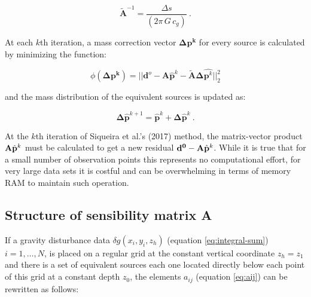 \documentclass[paper]{geophysics}
\begin{document}
\begin{equation}
\tilde{\mathbf{A}}^{-1} = \frac{\Delta s}{(2 \pi \, G \, c_g)} \: .
\label{eq:a_approx}
\end{equation}

At each $k$th iteration, a mass correction vector $\mathbf{\Delta p^k}$ for every source is calculated by minimizing the function:

\begin{equation}
\phi(\mathbf{\Delta p^k}) = ||\mathbf{d}^{o} - \mathbf{A}\hat{\mathbf{p}}^k - \tilde{\mathbf{A}} \mathbf{\Delta} \hat{\mathbf{p}^k}||_2^2
\label{eq:goal-function_fast}
\end{equation}

\noindent and the mass distribution of the equivalent sources is updated as:

\begin{equation}
\mathbf{\Delta} \hat{\mathbf{p}}^{k+1} = \hat{\mathbf{p}}^{k} + \mathbf{\Delta} \hat{\mathbf{p}}^{k} \: .
\label{eq:update_m}
\end{equation}


At the $k$th iteration of Siqueira et al.'s (2017) method, the matrix-vector product $\tensor{A} \hat{\mathbf{p}}^{k}$ must be calculated to get a new residual $\mathbf{d^0} - \tensor{A} \hat{\mathbf{p}}^{k}$. While it is true that for a small number of observation points this represents no computational effort, for very large data sets it is costful and can be overwhelming in terms of memory RAM to maintain such operation.

\subsection{Structure of sensibility matrix A}
If a gravity disturbance  data $\delta g(x_i, y_i, z_h)$ (equation \ref{eq:integral-sum}) $i = 1, \dots, N$, is placed on a regular grid at the constant vertical coordinate $z_{h} = z_{1}$ and there is a set of equivalent sources each one located directly below each point of this grid at a constant depth $z_{0}$, the elements $a_{ij}$ (equation \ref{eq:aij}) can be rewritten as follows:
\end{document}
